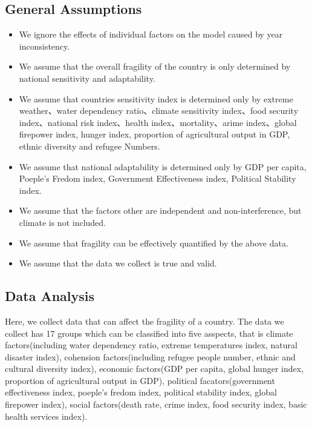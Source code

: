 \documentclass{mcmthesis}
\begin{document}
\subsection{General Assumptions}
\begin{itemize}
  \item We ignore the effects of individual factors on the model caused by year inconsistency.
  \item We assume that the overall fragility of the country is only determined by national sensitivity and adaptability.
  \item We assume that countries sensitivity index is determined only by extreme weather、water dependency ratio、climate sensitivity index、food security index、national risk index、health index、mortality、arime index、global firepower index, hunger index,  proportion of agricultural output in GDP, ethnic diversity and refugee Numbers.
  \item We assume that national adaptability is determined only by GDP per capita, Poeple's Fredom index, Government Effectiveness index, Political Stability index.
  \item We assume that the factors other are independent and non-interference, but climate is not included.
  \item We assume that fragility can be effectively quantified by the above data.
  \item We assume that the data we collect is true and valid.
\end{itemize}
\subsection{Data Analysis}
Here, we collect data that can affect the fragility of a country. The data we collect has 
17 groups which can be classified into five asspects, that is climate factors(including water 
dependency ratio, extreme temperatures index, natural disaster index), cohension factors(including 
refugee people number, ethnic and cultural diversity index), economic factors(GDP per capita, global 
hunger index, proportion of agricultural output in GDP), political facators(government effectiveness 
index, poeple's fredom index, political stability index, global firepower index), social factors(death 
rate, crime index, food security index, basic health services index).
\end{document}
